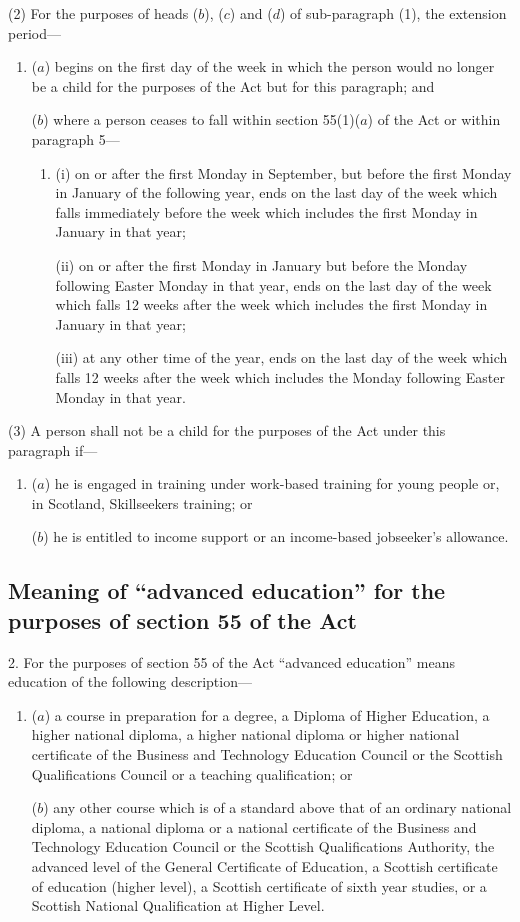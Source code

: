 \documentclass[12pt,a4paper]{article}
\begin{document}
(2) For the purposes of heads ($b$), ($c$)  and ($d$)  of sub-paragraph (1), the extension period—
\begin{enumerate}\item[]
($a$) begins on the first day of the week in which the person would no longer be a child for the purposes of the Act but for this paragraph; and

($b$) where a person ceases to fall within section 55(1)($a$)  of the Act or within paragraph 5—
\begin{enumerate}\item[]
(i) on or after the first Monday in September, but before the first Monday in January of the following year, ends on the last day of the week which falls immediately before the week which includes the first Monday in January in that year;

(ii) on or after the first Monday in January but before the Monday following Easter Monday in that year, ends on the last day of the week which falls 12 weeks after the week which includes the first Monday in January in that year;

(iii) at any other time of the year, ends on the last day of the week which falls 12 weeks after the week which includes the Monday following Easter Monday in that year.
\end{enumerate}
\end{enumerate}

(3) A person shall not be a child for the purposes of the Act under this paragraph if—
\begin{enumerate}\item[]
($a$) he is engaged in training under work-based training for young people or, in Scotland, Skillseekers training; or

($b$) he is entitled to income support or an income-based jobseeker’s allowance.
\end{enumerate}

\subsection*{Meaning of “advanced education” for the purposes of section 55 of the Act}

2.  For the purposes of section 55 of the Act “advanced education” means education of the following description—
\begin{enumerate}\item[]
($a$) a course in preparation for a degree, a Diploma of Higher Education, a higher national diploma, a higher national diploma or higher national certificate of the Business and Technology Education Council or the Scottish Qualifications Council or a teaching qualification; or

($b$) any other course which is of a standard above that of an ordinary national diploma, a national diploma or a national certificate of the Business and Technology Education Council or the Scottish Qualifications Authority, the advanced level of the General Certificate of Education, a Scottish certificate of education (higher level), a Scottish certificate of sixth year studies, or a Scottish National Qualification at Higher Level.
\end{enumerate}
\end{document}

